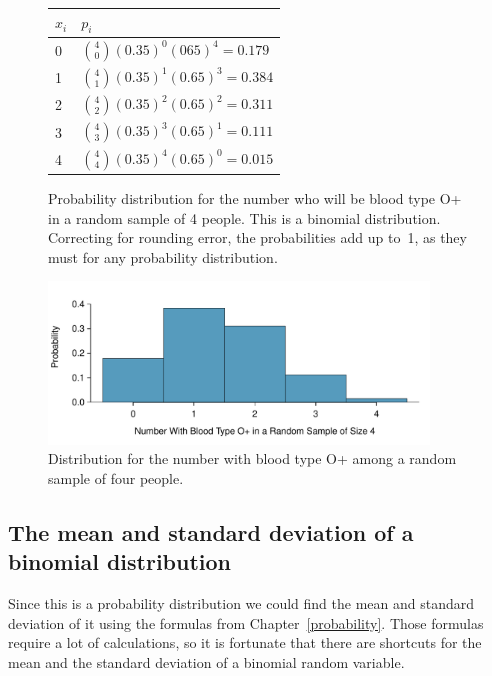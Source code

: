 \begin{figure}[h]
\centering
\begin{tabular}{l l}
$x_i$ & $p_i$ \\
\hline
0 &  ${4\choose 0}(0.35)^0(065)^{4} = 0.179$ \vspace{1mm}\\
1 &  ${4\choose 1}(0.35)^1(0.65)^{3} = 0.384$  \vspace{1mm}\\
2 & ${4\choose 2}(0.35)^2(0.65)^{2} = 0.311$  \vspace{1mm}\\
3 & ${4\choose 3}(0.35)^3(0.65)^{1} = 0.111$  \vspace{1mm}\\
4 & ${4\choose 4}(0.35)^4(0.65)^{0} = 0.015$  \vspace{1mm}\\
\hline
\end{tabular}
\caption{Probability distribution for the number who will be blood type O+ in a random sample of 4 people. This is a binomial distribution. Correcting for rounding error, the probabilities add up to~1, as they must for any probability distribution.}
\label{binomDistrOPositive}
\end{figure}

\begin{figure}[h]
\centering
\includegraphics[width=0.9\textwidth]{ch_distributions/figures/oPositive4/oPositive4}
\caption{Distribution for the number with blood type O+ among a random sample of four people.}
\label{oPositive4}
\end{figure}



\subsection{The mean and standard deviation of a binomial distribution}

Since this is a probability distribution we could find the mean and standard deviation of it using the formulas from Chapter~\ref{probability}. Those formulas require a lot of calculations, so it is fortunate that there are shortcuts for the mean and the standard deviation of a binomial random variable.

